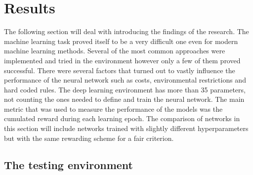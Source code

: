 \documentclass[
]{elteikthesis}[2023/04/10]
\begin{document}
\newpage{}

\chapter{Results}

The following section will deal with introducing the findings of the
research. The machine learning task proved itself to be a very difficult
one even for modern machine learning methods. Several of the most
common approaches were implemented and tried in the environment however
only a few of them proved successful. There were several factors that
turned out to vastly influence the performance of the neural network
such as costs, environmental restrictions and hard coded rules. The
deep learning environment has more than 35 parameters, not counting
the ones needed to define and train the neural network. The main metric
that was used to measure the performance of the models was the cumulated
reward during each learning epoch. The comparison of networks in this
section will include networks trained with slightly different hyperparameters
but with the same rewarding scheme for a fair criterion.

\section{The testing environment}
\end{document}
